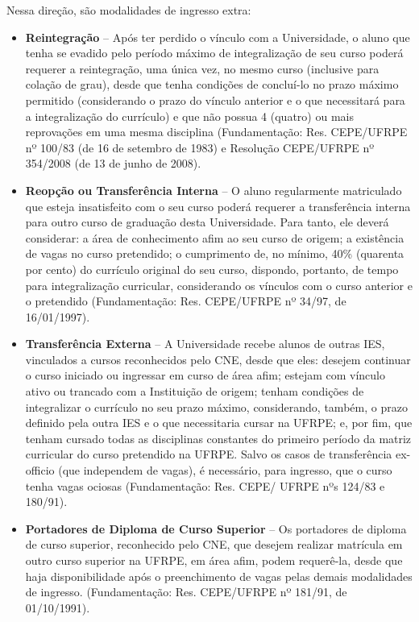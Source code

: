\documentclass[
	12pt,				%
	openright,			%
  oneside,     %
	a4paper,			%
	chapter=TITLE,		%
	english,			%
	french,				%
	spanish,			%
	brazil				%
	]{abntex2}
\begin{document}
Nessa direção, são modalidades de ingresso extra:

\begin{itemize}
    \item \textbf{Reintegração} – Após ter perdido o vínculo com a Universidade, o aluno que tenha se evadido pelo período máximo de integralização de seu curso poderá requerer a reintegração, uma única vez, no mesmo curso (inclusive para colação de grau), desde que tenha condições de concluí-lo no prazo máximo permitido (considerando o prazo do vínculo anterior e o que necessitará para a integralização do currículo) e que não possua 4 (quatro) ou mais reprovações em uma mesma disciplina (Fundamentação: Res. CEPE/UFRPE nº 100/83 (de 16 de setembro de 1983) e Resolução CEPE/UFRPE nº 354/2008 (de 13 de junho de 2008).
    \item \textbf{Reopção ou Transferência Interna} – O aluno regularmente matriculado que esteja insatisfeito com o seu curso poderá requerer a transferência interna para outro curso de graduação desta Universidade. Para tanto, ele deverá considerar: a área de conhecimento afim ao seu curso de origem; a existência de vagas no curso pretendido; o cumprimento de, no mínimo, 40\% (quarenta por cento) do currículo original do seu curso, dispondo, portanto, de tempo para integralização curricular, considerando os vínculos com o curso anterior e o pretendido (Fundamentação: Res. CEPE/UFRPE nº 34/97, de 16/01/1997).
    \item \textbf{Transferência Externa} – A Universidade recebe alunos de outras IES, vinculados a cursos reconhecidos pelo CNE, desde que eles: desejem continuar o curso iniciado ou ingressar em curso de área afim; estejam com vínculo ativo ou trancado com a Instituição de origem; tenham condições de integralizar o currículo no seu prazo máximo, considerando, também, o prazo definido pela outra IES e o que necessitaria cursar na UFRPE; e, por fim, que tenham cursado todas as disciplinas constantes do primeiro período da matriz curricular do curso pretendido na UFRPE. Salvo os casos de transferência ex-officio (que independem de vagas), é necessário, para ingresso, que o curso tenha vagas ociosas (Fundamentação: Res. CEPE/ UFRPE nºs 124/83 e 180/91).
    \item \textbf{Portadores de Diploma de Curso Superior} – Os portadores de diploma de curso superior, reconhecido pelo CNE, que desejem realizar matrícula em outro curso superior na UFRPE, em área afim, podem requerê-la, desde que haja disponibilidade após o preenchimento de vagas pelas demais modalidades de ingresso. (Fundamentação: Res. CEPE/UFRPE nº 181/91, de 01/10/1991).
\end{itemize}
\end{document}

